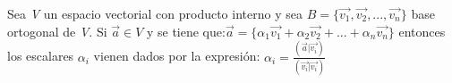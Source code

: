 \documentclass[preview]{standalone}
\begin{document}
\begin{center}
Sea \textit{V} un espacio vectorial con producto interno y sea \newline$B = \{\vec{v_1}, \vec{v_2}, ..., \vec{v_n}\}$ \newlineuna base ortogonal de \textit{V}. Si $\vec{a} \in V$ y se tiene que:\newline$\vec{a} = \{\alpha_1 \vec{v_1} + \alpha_2 \vec{v_2} + ... + \alpha_n \vec{v_n} \}$ \newline entonces los escalares $\alpha_i$ vienen dados por la expresión: \newline$\alpha_i = \frac{(\vec{a} | \vec{v_i})}{(\vec{v_i} | \vec{v_i})} $
\end{center}
\end{document}
